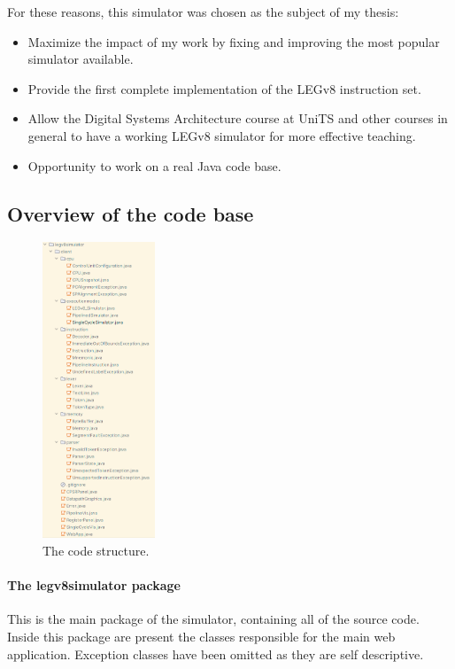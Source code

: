 For these reasons, this simulator was chosen as the subject of my thesis:

\begin{itemize}
	\item Maximize the impact of my work by fixing and improving the most popular simulator available.
	\item Provide the first complete implementation of the LEGv8 instruction set.
	\item Allow the Digital Systems Architecture course at UniTS and other courses in general to have a working LEGv8 simulator for more effective teaching.
	\item Opportunity to work on a real Java code base.
\end{itemize}

\newpage

\subsection*{Overview of the code base}

\begin{figure}
	\centering
	\includegraphics[width=0.30\textwidth]{img/classes.png}
	\caption{The code structure.}
\end{figure}

\paragraph*{The legv8simulator package}

This is the main package of the simulator, containing all of the source code. Inside this package are present the classes responsible for the main web application. Exception classes have been omitted as they are self descriptive.

